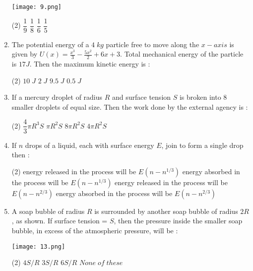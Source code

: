 \documentclass{article}
\begin{document}
\begin{enumerate}
\texttt{[image: 9.png]}

\begin{tasks}(2)
\task \(\dfrac{1}{9}\) \vspace{0.2 cm}
\task \(\dfrac{1}{8}\)
\task \(\dfrac{1}{6}\)
\task \(\dfrac{1}{5}\)
\end{tasks}
\item The potential energy of a \(4\;kg\) particle free to move along the \(x-axis\) is given by \(U(x)= \displaystyle  \frac {x^ {3}}{3} - \frac {5x^ {2}}{2}  +6x +3\). Total mechanical energy of the particle is \(17 J\). Then the maximum kinetic energy is :
\begin{tasks}(2)
\task \(10\;J\)
\task \(2\;J\)
\task \(9.5\;J\)
\task \(0.5\;J\)
\end{tasks}
\item If a mercury droplet of radius \(R\) and surface tension \(S\) is broken into 8 smaller droplets of equal size. Then the work done by the external agency is :
\begin{tasks}(2)
\task \( \dfrac{4}{3} \pi R^3 S \)
\task \(\pi R^2 S \)
\task \(8\pi R^2 S \)
\task \( 4\pi R^2 S \)
\end{tasks}
\item If \(n\) drops of a liquid, each with surface energy \(E\), join to form a single drop then :
\begin{tasks}(2)
\task energy released in the process will be \(E(n-n^{1/3})\)
\task energy absorbed in the process will be \(E(n-n^{1/3})\)
\task energy released in the process will be \(E(n-n^{2/3})\)
\task energy absorbed in the process will be \(E(n-n^{2/3})\)
\end{tasks}
\item A soap bubble of radius \(R\) is surrounded by another soap bubble of radius \(2R\), as shown. If surface tension = \(S\), then the pressure inside the smaller soap bubble, in excess of the atmospheric pressure, will be :

\texttt{[image: 13.png]}

\begin{tasks}(2)
\task \(4S/R\)
\task \(3S/R\)
\task \(6S/R\)
\task \(None \; of \; these\)
\end{tasks}
\end{enumerate}
\end{document}
